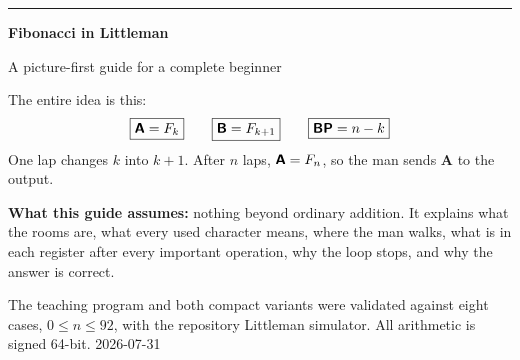 \documentclass[11pt,a4paper]{article}
\newcommand{\reg}[1]{\textsf{\bfseries #1}}
\newcommand{\Fib}[1]{F_{#1}}
\begin{document}
\begin{titlepage}
  \vspace*{1.0cm}

  {\color{gold}\rule{\textwidth}{2.2pt}}

  \vspace{0.8cm}
  {\sffamily\bfseries\fontsize{34}{39}\selectfont
    Fibonacci in Littleman\par}
  \vspace{0.25cm}
  {\sffamily\fontsize{20}{25}\selectfont
    A picture-first guide for a complete beginner\par}

  \vspace{0.8cm}

  \begin{keybox}
    \centering
    \Large
    The entire idea is this:
    \[
      \boxed{\reg{A}=\Fib{k}}
      \qquad
      \boxed{\reg{B}=\Fib{k+1}}
      \qquad
      \boxed{\reg{BP}=n-k}
    \]
    One lap changes \(k\) into \(k+1\). After \(n\) laps,
    \(\reg{A}=\Fib{n}\), so the man sends \reg{A} to the output.
  \end{keybox}

  \vfill

  \begin{center}
  \end{center}

  \vfill

  \begin{plainbox}
    \textbf{What this guide assumes:} nothing beyond ordinary addition.
    It explains what the rooms are, what every used character means,
    where the man walks, what is in each register after every important
    operation, why the loop stops, and why the answer is correct.
  \end{plainbox}

  \vspace{0.8cm}
  {\small
    The teaching program and both compact variants were validated against
    eight cases, \(0\le n\le92\), with the repository Littleman simulator.
    All arithmetic is signed 64-bit.
    \hfill 2026-07-31
  }
\end{titlepage}
\end{document}
